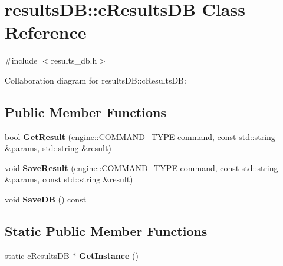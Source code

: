 \hypertarget{classresultsDB_1_1cResultsDB}{\section{results\-D\-B\-:\-:c\-Results\-D\-B Class Reference}
\label{classresultsDB_1_1cResultsDB}
}


{\ttfamily \#include $<$results\-\_\-db.\-h$>$}



Collaboration diagram for results\-D\-B\-:\-:c\-Results\-D\-B\-:
\subsection*{Public Member Functions}
\begin{DoxyCompactItemize}
\item 
\hypertarget{classresultsDB_1_1cResultsDB_a02d8a22f9d7aea2ee62385decb6e9c9e}{bool {\bfseries Get\-Result} (engine\-::\-C\-O\-M\-M\-A\-N\-D\-\_\-\-T\-Y\-P\-E command, const std\-::string \&params, std\-::string \&result)}\label{classresultsDB_1_1cResultsDB_a02d8a22f9d7aea2ee62385decb6e9c9e}

\item 
\hypertarget{classresultsDB_1_1cResultsDB_a9e27cf265d98568c31252b6164e5f0e5}{void {\bfseries Save\-Result} (engine\-::\-C\-O\-M\-M\-A\-N\-D\-\_\-\-T\-Y\-P\-E command, const std\-::string \&params, const std\-::string \&result)}\label{classresultsDB_1_1cResultsDB_a9e27cf265d98568c31252b6164e5f0e5}

\item 
\hypertarget{classresultsDB_1_1cResultsDB_a559abd644f2f1e2df8909bcf16fd2d07}{void {\bfseries Save\-D\-B} () const }\label{classresultsDB_1_1cResultsDB_a559abd644f2f1e2df8909bcf16fd2d07}

\end{DoxyCompactItemize}
\subsection*{Static Public Member Functions}
\begin{DoxyCompactItemize}
\item 
\hypertarget{classresultsDB_1_1cResultsDB_a8f6921a15fc1e574f8a356352824a0e5}{static \hyperlink{classresultsDB_1_1cResultsDB}{c\-Results\-D\-B} $\ast$ {\bfseries Get\-Instance} ()}\label{classresultsDB_1_1cResultsDB_a8f6921a15fc1e574f8a356352824a0e5}

\end{DoxyCompactItemize}
